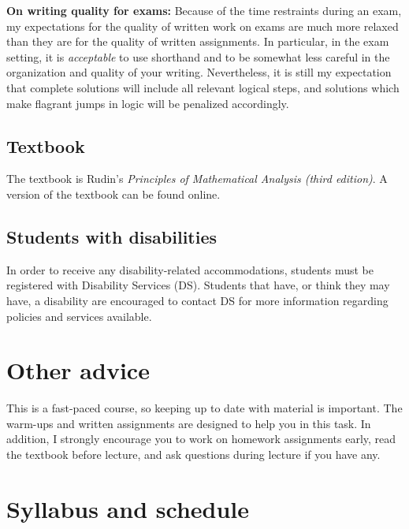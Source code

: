 \documentclass[12pt]{article}
\begin{document}
\medskip

\noindent \textbf{On writing quality for exams:} Because of the time restraints during an exam, my expectations for the quality of written work on exams are much more relaxed than they are for the quality of written assignments. In particular, in the exam setting, it is \emph{acceptable} to use shorthand and to be somewhat less careful in the organization and quality of your writing. Nevertheless, it is still my expectation that complete solutions will include all relevant logical steps, and solutions which make flagrant jumps in logic will be penalized accordingly. 


\subsection*{Textbook}

The textbook is Rudin's \emph{Principles of Mathematical Analysis (third edition)}. A version of the textbook can be found online. 

\subsection*{Students with disabilities}

In order to receive any disability-related accommodations, students must be registered with Disability Services (DS). Students that have, or think they may have, a disability are encouraged to contact DS for more information regarding policies and services available. 


\section*{Other advice}

This is a fast-paced course, so keeping up to date with material is important. The warm-ups and written assignments are designed to help you in this task. In addition, I strongly encourage you to work on homework assignments early, read the textbook before lecture, and ask questions during lecture if you have any. 


\section*{Syllabus and schedule}
\end{document}
